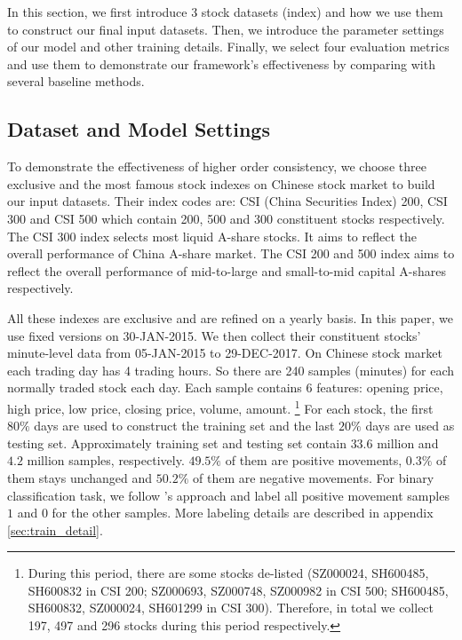 \documentclass[sigconf]{acmart}
\renewcommand{\citename}{\citet}
\begin{document}
In this section, we first introduce 3 stock datasets (index) and
how we use them to construct our final input datasets. Then, we
introduce the parameter settings of our model and other training
details. Finally, we select four evaluation metrics and use them
to demonstrate our framework's effectiveness by comparing with
several baseline methods.

\subsection{Dataset and Model Settings}
\label{sec:dataset}

To demonstrate the effectiveness of higher order consistency, we
choose three exclusive and the most famous stock indexes on Chinese
stock market to build our input datasets. Their index codes are:
CSI (China Securities Index) 200, CSI 300 and CSI 500 which
contain 200, 500 and 300 constituent stocks respectively. The CSI
300 index selects most liquid A-share stocks. It aims to reflect
the overall performance of China A-share market. The CSI 200 and
500 index aims to reflect the overall performance of mid-to-large
and small-to-mid capital A-shares respectively.

All these indexes are exclusive and are refined on a yearly
basis. In this paper, we use fixed versions on 30-JAN-2015. We
then collect their constituent stocks' minute-level data from
05-JAN-2015 to 29-DEC-2017. On Chinese stock market each trading
day has 4 trading hours. So there are 240 samples (minutes) for
each normally traded stock each day. Each sample contains 6
features: opening price, high price, low price, closing price,
volume, amount. \footnote{During this period, there are some
  stocks de-listed (SZ000024, SH600485, SH600832 in CSI 200;
  SZ000693, SZ000748, SZ000982 in CSI 500; SH600485, SH600832,
  SZ000024, SH601299 in CSI 300). Therefore, in total we collect
  197, 497 and 296 stocks during this period respectively.} For
each stock, the first $80\%$ days are used to construct the
training set and the last $20\%$ days are used as testing set.
Approximately training set and testing set contain $33.6$ million
and $4.2$ million samples, respectively. $49.5\%$ of them are
positive movements, $0.3\%$ of them stays unchanged and $50.2\%$
of them are negative movements. For binary classification task,
we follow \citename{mitchell2001characteristics}'s approach and
label all positive movement samples $1$ and $0$ for the other
samples. More labeling details are described in appendix
\ref{sec:train_detail}.
\end{document}
